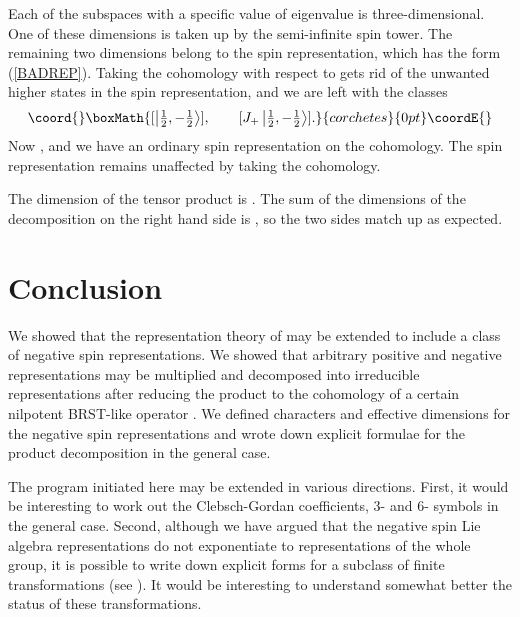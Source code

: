 \documentclass[a4paper,dvips,12pt]{article}
\providecommand {\half} {{1 \over 2}}
\providecommand {\hhalf} {{\textstyle{1 \over 2}}}
\providecommand {\ket}[1] {\left| #1 \right>}
\begin{document}
    Each of the subspaces with a specific value of \coordHE{}
    eigenvalue \coordHE{} is three-dimensional.  One of these dimensions
    is taken up by the semi-infinite spin \myHighlight{$-\half$}\coordHE{} tower.  The
    remaining two dimensions belong to the spin \myHighlight{$\half$}\coordHE{}
    representation, which has the form (\ref{BADREP}).  Taking the
    cohomology with respect to \coordHE{} gets rid of the unwanted
    higher \coordHE{} states in the spin \myHighlight{$\half$}\coordHE{} representation, and we
    are left with the classes
    \[\coord{}\boxMath{
        [\ket{\hhalf, \textstyle{-\half}}], \qquad [J_+\ket{\hhalf, \textstyle{-\half}}].
    }{corchetes}{0pt}\coordE{}\]
    Now \myHighlight{$[J_+]^2 \,[\ket{\half, -\half}] = 0$}\coordHE{}, and we have an
    ordinary spin \myHighlight{$\half$}\coordHE{} representation on the cohomology.  The
    spin \myHighlight{$-\half$}\coordHE{} representation remains unaffected by taking the
    cohomology.

    The dimension of the tensor product is \myHighlight{$3\cdot\half = {3\over
    2}$}\coordHE{}.  The sum of the dimensions of the decomposition on the
    right hand side is \myHighlight{$2 - \half = {3\over 2}$}\coordHE{}, so the two sides
    match up as expected.



    \section{Conclusion}

    We showed that the representation theory of \coordHE{} may be
    extended to include a class of negative spin representations.
    We showed that arbitrary positive and negative representations
    may be multiplied and decomposed into irreducible
    representations after reducing the
    product to the cohomology of a certain nilpotent BRST-like operator
    \coordHE{}.  We defined characters and effective dimensions for the negative spin
    representations and
    wrote down explicit formulae for the product decomposition
    in the general case.

    The program initiated here may be extended in various
    directions.  First, it would be interesting to work out
    the Clebsch-Gordan coefficients, 3-\coordHE{} and 6-\coordHE{} symbols in
    the general case.  Second, although we have argued that the
    negative spin Lie algebra representations do not exponentiate
    to representations of the whole group, it is possible to
    write down explicit forms for a subclass of finite \coordHE{}
    transformations (see \cite{MYSELF}).  It would be interesting
    to understand somewhat better the status of these
    transformations.
\end{document}

